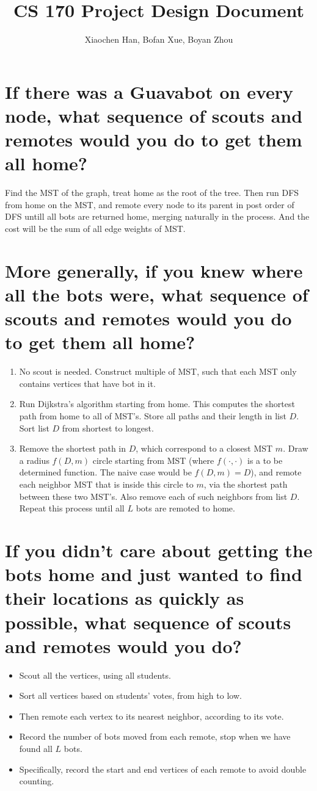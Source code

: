 \documentclass[10pt,a4paper]{article}
\author{Xiaochen Han, Bofan Xue, Boyan Zhou}
\title{CS 170 Project Design Document}
\begin{document}
\maketitle

\section{If there was a Guavabot on every node, what sequence of scouts and remotes would you do to get them all home?}
Find the MST of the graph, treat home as the root of the tree.
Then run DFS from home on the MST, and remote every node to its 
parent in post order of DFS untill all bots are returned home, merging naturally in the process.
And the cost will be the sum of all edge weights of MST.

\section{More generally, if you knew where all the bots were, what sequence of scouts and remotes would you do to get them all home?}
\begin{enumerate}[label=(\alph*)]
\item No scout is needed. Construct multiple of MST, such that each MST only contains vertices that have bot in it. 
\item Run Dijkstra's algorithm starting from home. This computes the shortest path from home to all of MST's. Store all paths and their length in list $D$. Sort list $D$ from shortest to longest.
\item Remove the shortest path in $D$, which correspond to a closest MST $m$. Draw a radius $f(D, m)$ circle starting from MST (where $f(\cdot, \cdot)$ is a to be determined function. The naive case would be $f(D, m) = D$), 
and remote each neighbor MST that is inside this circle to $m$, via the shortest path between these two MST's. Also remove each of such neighbors from list $D$. Repeat this process until all $L$ bots are remoted to home.

\end{enumerate}

\section{If you didn't care about getting the bots home and just wanted to find their locations as quickly as possible, what sequence of scouts and remotes would you do?}
\begin{itemize}
\item Scout all the vertices, using all students. 
\item Sort all vertices based on students' votes, from high to low. 
\item Then remote each vertex to its nearest neighbor, according to its vote.
\item Record the number of bots moved from each remote, stop when we have found all $L$ bots. 
\item Specifically, record the start and end vertices of each remote to avoid double counting.
\end{itemize}
\end{document}
